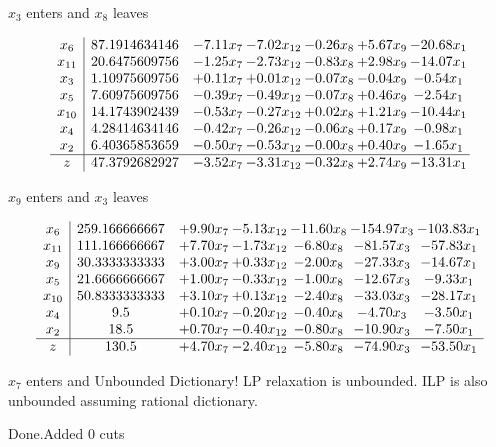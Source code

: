 \documentclass[8pt]{article}
\begin{document}
 $ x_{3} $ enters and $ x_{8} $ leaves 

 \[\begin{array}{c| c c@{\hskip 2pt} c@{\hskip 2pt} c@{\hskip 2pt} c@{\hskip 2pt} c@{\hskip 2pt} }
 x_{6}   &  87.1914634146 & -7.11 x_{7} & -7.02 x_{12} & -0.26 x_{8} & +  5.67 x_{9} & -20.68 x_{1}\\
 x_{11}   &  20.6475609756 & -1.25 x_{7} & -2.73 x_{12} & -0.83 x_{8} & +  2.98 x_{9} & -14.07 x_{1}\\
 x_{3}   &  1.10975609756 & +  0.11 x_{7} & +  0.01 x_{12} & -0.07 x_{8} & -0.04 x_{9} & -0.54 x_{1}\\
 x_{5}   &  7.60975609756 & -0.39 x_{7} & -0.49 x_{12} & -0.07 x_{8} & +  0.46 x_{9} & -2.54 x_{1}\\
 x_{10}   &  14.1743902439 & -0.53 x_{7} & -0.27 x_{12} & +  0.02 x_{8} & +  1.21 x_{9} & -10.44 x_{1}\\
 x_{4}   &  4.28414634146 & -0.42 x_{7} & -0.26 x_{12} & -0.06 x_{8} & +  0.17 x_{9} & -0.98 x_{1}\\
 x_{2}   &  6.40365853659 & -0.50 x_{7} & -0.53 x_{12} & -0.00 x_{8} & +  0.40 x_{9} & -1.65 x_{1}\\
\hline
z    &  47.3792682927 & -3.52 x_{7} & -3.31 x_{12} & -0.32 x_{8} & +  2.74 x_{9} & -13.31 x_{1}\\
\end{array}\]


 $ x_{9} $ enters and $ x_{3} $ leaves 

 \[\begin{array}{c| c c@{\hskip 2pt} c@{\hskip 2pt} c@{\hskip 2pt} c@{\hskip 2pt} c@{\hskip 2pt} }
 x_{6}   &  259.166666667 & +  9.90 x_{7} & -5.13 x_{12} & -11.60 x_{8} & -154.97 x_{3} & -103.83 x_{1}\\
 x_{11}   &  111.166666667 & +  7.70 x_{7} & -1.73 x_{12} & -6.80 x_{8} & -81.57 x_{3} & -57.83 x_{1}\\
 x_{9}   &  30.3333333333 & +  3.00 x_{7} & +  0.33 x_{12} & -2.00 x_{8} & -27.33 x_{3} & -14.67 x_{1}\\
 x_{5}   &  21.6666666667 & +  1.00 x_{7} & -0.33 x_{12} & -1.00 x_{8} & -12.67 x_{3} & -9.33 x_{1}\\
 x_{10}   &  50.8333333333 & +  3.10 x_{7} & +  0.13 x_{12} & -2.40 x_{8} & -33.03 x_{3} & -28.17 x_{1}\\
 x_{4}   &  9.5 & +  0.10 x_{7} & -0.20 x_{12} & -0.40 x_{8} & -4.70 x_{3} & -3.50 x_{1}\\
 x_{2}   &  18.5 & +  0.70 x_{7} & -0.40 x_{12} & -0.80 x_{8} & -10.90 x_{3} & -7.50 x_{1}\\
\hline
z    &  130.5 & +  4.70 x_{7} & -2.40 x_{12} & -5.80 x_{8} & -74.90 x_{3} & -53.50 x_{1}\\
\end{array}\]


 $ x_{7} $ enters and Unbounded Dictionary!
 LP relaxation is unbounded. ILP is also unbounded assuming rational dictionary. 

Done.Added 0 cuts 
\end{document}
